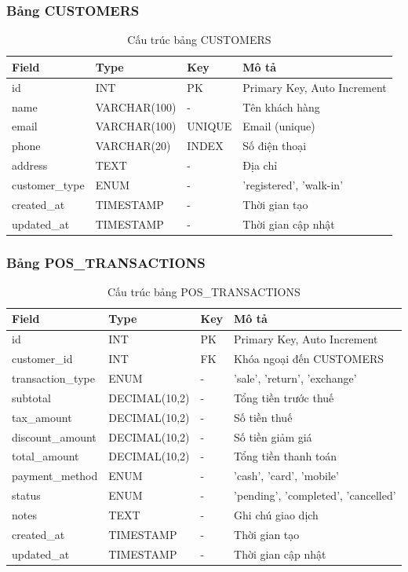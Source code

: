 \documentclass[12pt,a4paper]{article}
\begin{document}
\subsubsection{Bảng CUSTOMERS}
\begin{table}[H]
\centering
\begin{tabular}{@{}llll@{}}
\toprule
\textbf{Field} & \textbf{Type} & \textbf{Key} & \textbf{Mô tả} \\
\midrule
id & INT & PK & Primary Key, Auto Increment \\
name & VARCHAR(100) & - & Tên khách hàng \\
email & VARCHAR(100) & UNIQUE & Email (unique) \\
phone & VARCHAR(20) & INDEX & Số điện thoại \\
address & TEXT & - & Địa chỉ \\
customer\_type & ENUM & - & 'registered', 'walk-in' \\
created\_at & TIMESTAMP & - & Thời gian tạo \\
updated\_at & TIMESTAMP & - & Thời gian cập nhật \\
\bottomrule
\end{tabular}
\caption{Cấu trúc bảng CUSTOMERS}
\end{table}

\subsubsection{Bảng POS\_TRANSACTIONS}
\begin{table}[H]
\centering
\begin{tabular}{@{}llll@{}}
\toprule
\textbf{Field} & \textbf{Type} & \textbf{Key} & \textbf{Mô tả} \\
\midrule
id & INT & PK & Primary Key, Auto Increment \\
customer\_id & INT & FK & Khóa ngoại đến CUSTOMERS \\
transaction\_type & ENUM & - & 'sale', 'return', 'exchange' \\
subtotal & DECIMAL(10,2) & - & Tổng tiền trước thuế \\
tax\_amount & DECIMAL(10,2) & - & Số tiền thuế \\
discount\_amount & DECIMAL(10,2) & - & Số tiền giảm giá \\
total\_amount & DECIMAL(10,2) & - & Tổng tiền thanh toán \\
payment\_method & ENUM & - & 'cash', 'card', 'mobile' \\
status & ENUM & - & 'pending', 'completed', 'cancelled' \\
notes & TEXT & - & Ghi chú giao dịch \\
created\_at & TIMESTAMP & - & Thời gian tạo \\
updated\_at & TIMESTAMP & - & Thời gian cập nhật \\
\bottomrule
\end{tabular}
\caption{Cấu trúc bảng POS\_TRANSACTIONS}
\end{table}
\end{document}
